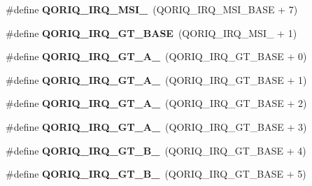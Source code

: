 \begin{DoxyCompactItemize}
\item 
\mbox{\label{group__QoriqInterruptIPI_ga8687366746db88843b6cc839e5901e0b}} 
\#define {\bfseries Q\+O\+R\+I\+Q\+\_\+\+I\+R\+Q\+\_\+\+M\+S\+I\+\_}~(Q\+O\+R\+I\+Q\+\_\+\+I\+R\+Q\+\_\+\+M\+S\+I\+\_\+\+B\+A\+SE + 7)
\item 
\mbox{\label{group__QoriqInterruptIPI_ga7a2c0e7e9d5c678164be83e2bcd35cdc}} 
\#define {\bfseries Q\+O\+R\+I\+Q\+\_\+\+I\+R\+Q\+\_\+\+G\+T\+\_\+\+B\+A\+SE}~(Q\+O\+R\+I\+Q\+\_\+\+I\+R\+Q\+\_\+\+M\+S\+I\+\_ + 1)
\item 
\mbox{\label{group__QoriqInterruptIPI_gab4eafd08f9d63ebcf2eea3522ac5d285}} 
\#define {\bfseries Q\+O\+R\+I\+Q\+\_\+\+I\+R\+Q\+\_\+\+G\+T\+\_\+\+A\+\_}~(Q\+O\+R\+I\+Q\+\_\+\+I\+R\+Q\+\_\+\+G\+T\+\_\+\+B\+A\+SE + 0)
\item 
\mbox{\label{group__QoriqInterruptIPI_ga751eb453c2736a66619272c577dd6a0b}} 
\#define {\bfseries Q\+O\+R\+I\+Q\+\_\+\+I\+R\+Q\+\_\+\+G\+T\+\_\+\+A\+\_}~(Q\+O\+R\+I\+Q\+\_\+\+I\+R\+Q\+\_\+\+G\+T\+\_\+\+B\+A\+SE + 1)
\item 
\mbox{\label{group__QoriqInterruptIPI_gae84e5a7ce981921c2cfffc343e311d48}} 
\#define {\bfseries Q\+O\+R\+I\+Q\+\_\+\+I\+R\+Q\+\_\+\+G\+T\+\_\+\+A\+\_}~(Q\+O\+R\+I\+Q\+\_\+\+I\+R\+Q\+\_\+\+G\+T\+\_\+\+B\+A\+SE + 2)
\item 
\mbox{\label{group__QoriqInterruptIPI_ga5ffd8fbd999237593919c887335e8a97}} 
\#define {\bfseries Q\+O\+R\+I\+Q\+\_\+\+I\+R\+Q\+\_\+\+G\+T\+\_\+\+A\+\_}~(Q\+O\+R\+I\+Q\+\_\+\+I\+R\+Q\+\_\+\+G\+T\+\_\+\+B\+A\+SE + 3)
\item 
\mbox{\label{group__QoriqInterruptIPI_gaca720acf2a77d913f8bae132c2c651e0}} 
\#define {\bfseries Q\+O\+R\+I\+Q\+\_\+\+I\+R\+Q\+\_\+\+G\+T\+\_\+\+B\+\_}~(Q\+O\+R\+I\+Q\+\_\+\+I\+R\+Q\+\_\+\+G\+T\+\_\+\+B\+A\+SE + 4)
\item 
\mbox{\label{group__QoriqInterruptIPI_ga25bd82ec8b7b629a4ae338918396a7c7}} 
\#define {\bfseries Q\+O\+R\+I\+Q\+\_\+\+I\+R\+Q\+\_\+\+G\+T\+\_\+\+B\+\_}~(Q\+O\+R\+I\+Q\+\_\+\+I\+R\+Q\+\_\+\+G\+T\+\_\+\+B\+A\+SE + 5)

\end{DoxyCompactItemize}
